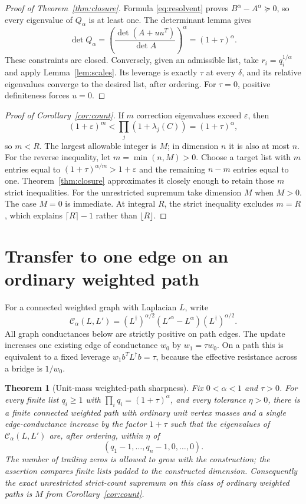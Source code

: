 \documentclass[11pt]{article}
\newtheorem{theorem}{Theorem}[section]
\begin{document}
\begin{proof}[Proof of Theorem~\ref{thm:closure}]
Formula \eqref{eq:resolvent} proves $B^\alpha-A^\alpha\succeq0$,
so every eigenvalue of $Q_\alpha$ is at least one. The determinant
lemma gives
\[
 \det Q_\alpha
    =\left(\frac{\det(A+uu^T)}{\det A}\right)^\alpha
    =(1+\tau)^\alpha.
\]
These constraints are closed. Conversely, given an admissible list,
take $r_i=q_i^{1/\alpha}$ and apply Lemma~\ref{lem:scales}.
Its leverage is exactly $\tau$ at every $\delta$, and its relative
eigenvalues converge to the desired list, after ordering.
For $\tau=0$, positive definiteness forces $u=0$.
\end{proof}

\begin{proof}[Proof of Corollary~\ref{cor:count}]
If $m$ correction eigenvalues exceed $\varepsilon$, then
\[
 (1+\varepsilon)^m<\prod_j(1+\lambda_j(C))
                 =(1+\tau)^\alpha,
\]
so $m<R$. The largest allowable integer is $M$; in dimension $n$ it
is also at most $n$.
For the reverse inequality, let $m=\min(n,M)>0$. Choose a target
list with $m$ entries equal to $(1+\tau)^{\alpha/m}>1+\varepsilon$
and the remaining $n-m$ entries equal to one. Theorem~\ref{thm:closure}
approximates it closely enough to retain those $m$ strict inequalities.
For the unrestricted supremum take dimension $M$ when $M>0$.
The case $M=0$ is immediate. At integral $R$, the strict inequality
excludes $m=R$, which explains $\lceil R\rceil-1$ rather than
$\lfloor R\rfloor$.
\end{proof}

\section{Transfer to one edge on an ordinary weighted path}
For a connected weighted graph with Laplacian $L$, write
\[
 \mathcal C_\alpha(L,L')
  =(L^\dagger)^{\alpha/2}(L'^\alpha-L^\alpha)(L^\dagger)^{\alpha/2}.
\]
All graph conductances below are strictly positive on path edges.
The update increases one existing edge of conductance $w_0$ by
$w_1=\tau w_0$. On a path this is equivalent to a fixed leverage
$w_1 b^TL^\dagger b=\tau$, because the effective resistance across a
bridge is $1/w_0$.

\begin{theorem}[Unit-mass weighted-path sharpness]\label{thm:path}
Fix $0<\alpha<1$ and $\tau>0$. For every finite list
$q_i\ge1$ with $\prod_iq_i=(1+\tau)^\alpha$, and every tolerance
$\eta>0$, there is a finite connected weighted path with ordinary
unit vertex masses and a single edge-conductance increase by the
factor $1+\tau$ such that the eigenvalues of
$\mathcal C_\alpha(L,L')$ are, after ordering, within $\eta$ of
\[
 (q_1-1,\ldots,q_n-1,0,\ldots,0).
\]
The number of trailing zeros is allowed to grow with the construction;
the assertion compares finite lists padded to the constructed dimension.
Consequently the exact unrestricted strict-count supremum on this class
of ordinary weighted paths is $M$ from Corollary~\ref{cor:count}.
\end{theorem}
\end{document}
